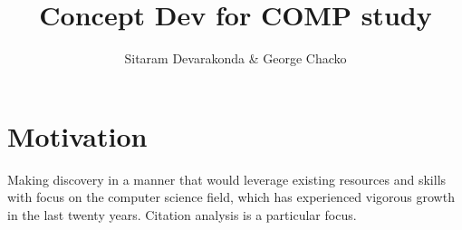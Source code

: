 \documentclass[11pt, oneside]{article}   	%
\title{Concept Dev for COMP study}
\author{Sitaram Devarakonda \& George Chacko}
\begin{document}
\maketitle
\section{Motivation} Making discovery in a manner that would leverage existing resources and skills with focus on  the computer science field, which has experienced vigorous growth in the last twenty years. Citation analysis is a particular focus. 

\end{document}
